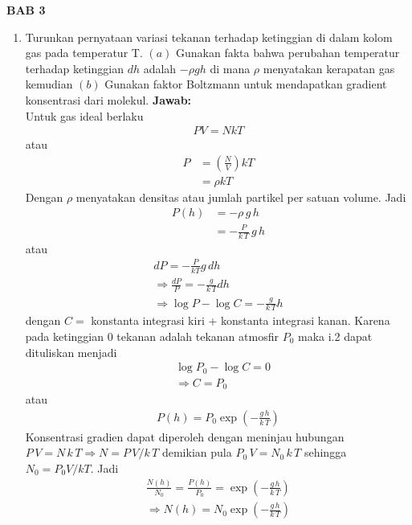 \documentclass[a4paper , 12 pt]{article}
\begin{document}
\textbf{BAB 3}
\begin{enumerate}
\item Turunkan pernyataan variasi tekanan terhadap ketinggian di dalam kolom gas pada temperatur T. $(a)$ Gunakan fakta bahwa perubahan temperatur terhadap ketinggian  $dh$ adalah $- \rho g h $ di mana $\rho $ menyatakan kerapatan gas kemudian  $(b)$ Gunakan faktor Boltzmann untuk mendapatkan gradient konsentrasi  dari molekul.  \newline 
\textbf{Jawab:} \\
Untuk gas ideal berlaku 
\begin{align}
PV  = N k T \tag{i.1}
\end{align}
atau 
\begin{align}
	 P& = \left( \frac{N}{V} \right)  kT \nonumber \\
	& = \rho k T \nonumber
\end{align}
Dengan $\rho$  menyatakan densitas atau jumlah partikel per satuan volume. Jadi 
\begin{align}
	P (h)& = - \rho \, g \, h \nonumber \\
	& =  - \frac{P}{k \, T} \,g \, h \nonumber 
\end{align}
atau 
\begin{align}
&d P   = - \frac{P}{k T} g \, d h  \nonumber \\
& \Rightarrow \frac{dP}{P} = - \frac{g}{k \, T} dh  &
\nonumber  \\
&\Rightarrow \log P - \log C = - \frac{g}{k \, T} h   \nonumber \tag{i.2}
\end{align}
dengan $C =  $ konstanta integrasi  kiri  +  konstanta  integrasi  kanan.  Karena pada ketinggian $0$ tekanan adalah tekanan atmosfir $P_0  $ maka  i.2 dapat dituliskan menjadi
\begin{align}
&\log P_0 - \log C = 0 \nonumber \\
 & \Rightarrow C = P_0 \nonumber 
\end{align}
atau 
\begin{align}
P (h) = P_0 \exp \left( - \frac{g\,h}{k\, T}\right) \tag{QED}
\end{align}
Konsentrasi gradien dapat diperoleh dengan meninjau hubungan $P\,V = N \,k\, T \Rightarrow N = P\,V/k\,T $ demikian pula $P_0 \,V  = N_0 \,k \,T $  sehingga $N_0 = P_0 V / k T$. Jadi
\begin{align}
\frac{N(h)}{N_0} = \frac{P(h)}{P_0} = \exp
 \left( - \frac{g\, h }{k\, T}\right) \nonumber \\
 \Rightarrow N(h) = N_0  \exp
  \left( - \frac{g\, h }{k\, T}\right) \nonumber

\end{align}
\end{enumerate}
\end{document}
